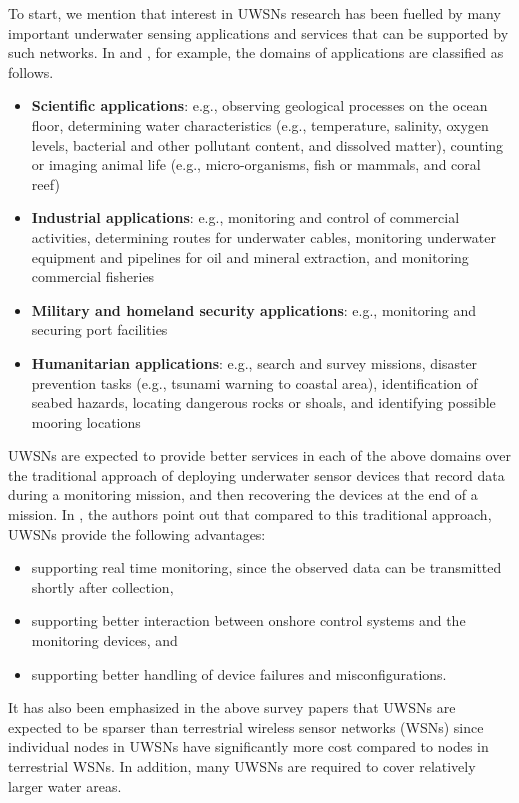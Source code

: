 To start, we mention that interest in UWSNs research has been fuelled by many important underwater sensing applications and services that can be supported by such networks.
In  \cite{akyildiz2005underwater} and \cite{heidemann2012underwater}, for example, the domains of applications are classified as follows.
\begin{itemize}
\item \textbf{Scientific applications}: e.g., observing  geological processes on the ocean floor, determining water characteristics (e.g., temperature, salinity, oxygen levels, bacterial and other pollutant content, and dissolved matter), counting or imaging animal life (e.g., micro-organisms, fish or mammals, and coral reef)
\item \textbf{Industrial applications}: e.g., monitoring and control of commercial activities, determining routes for underwater cables, monitoring underwater equipment  and pipelines for oil and mineral extraction, and monitoring commercial fisheries
\item \textbf{Military and homeland security applications}: e.g., monitoring and securing port facilities

\item \textbf{Humanitarian applications}: e.g., search and survey missions, disaster prevention tasks (e.g., tsunami warning to coastal area), identification of seabed hazards, locating dangerous rocks or shoals, and identifying possible mooring locations
\end{itemize}

UWSNs are expected to provide better services in each of the above domains over the traditional approach of deploying underwater sensor devices that record data during a monitoring mission, and then recovering the devices at the end of a mission.
In \cite{akyildiz2005underwater}, the authors point out that compared to this traditional approach, UWSNs provide the following advantages:
\begin{itemize}[noitemsep]
\item supporting real time monitoring, since the observed data can be transmitted shortly after collection,
\item supporting better interaction between onshore control systems and the monitoring devices, and
\item supporting better handling of device failures and misconfigurations.
\end{itemize}
It has also been emphasized in the above survey papers that UWSNs are expected to be sparser than terrestrial wireless sensor networks (WSNs) since individual nodes in UWSNs have significantly more cost compared to nodes in terrestrial WSNs. In addition, many UWSNs are required to cover relatively larger water areas.

